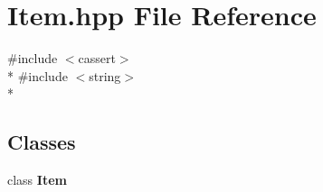 \section{Item.\-hpp File Reference}
\label{_item_8hpp}
{\ttfamily \#include $<$cassert$>$}\\*
{\ttfamily \#include $<$string$>$}\\*
\subsection*{Classes}
\begin{DoxyCompactItemize}
\item 
class {\bf Item}
\end{DoxyCompactItemize}
